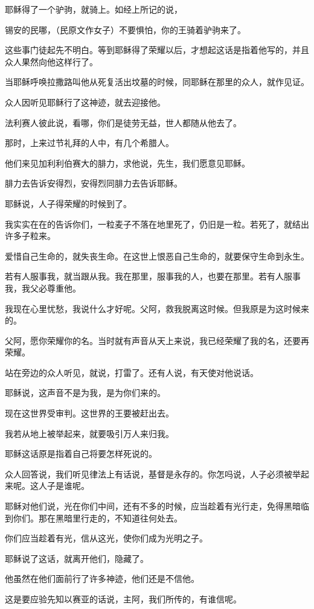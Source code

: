 \documentclass[12pt,oneside]{book}
\begin{document}
耶稣得了一个驴驹，就骑上。如经上所记的说，

锡安的民哪，（民原文作女子）不要惧怕，你的王骑着驴驹来了。

这些事门徒起先不明白。等到耶稣得了荣耀以后，才想起这话是指着他写的，并且众人果然向他这样行了。

当耶稣呼唤拉撒路叫他从死复活出坟墓的时候，同耶稣在那里的众人，就作见证。

众人因听见耶稣行了这神迹，就去迎接他。

法利赛人彼此说，看哪，你们是徒劳无益，世人都随从他去了。

那时，上来过节礼拜的人中，有几个希腊人。

他们来见加利利伯赛大的腓力，求他说，先生，我们愿意见耶稣。

腓力去告诉安得烈，安得烈同腓力去告诉耶稣。

耶稣说，人子得荣耀的时候到了。

我实实在在的告诉你们，一粒麦子不落在地里死了，仍旧是一粒。若死了，就结出许多子粒来。

爱惜自己生命的，就失丧生命。在这世上恨恶自己生命的，就要保守生命到永生。

若有人服事我，就当跟从我。我在那里，服事我的人，也要在那里。若有人服事我，我父必尊重他。

我现在心里忧愁，我说什么才好呢。父阿，救我脱离这时候。但我原是为这时候来的。

父阿，愿你荣耀你的名。当时就有声音从天上来说，我已经荣耀了我的名，还要再荣耀。

站在旁边的众人听见，就说，打雷了。还有人说，有天使对他说话。

耶稣说，这声音不是为我，是为你们来的。

现在这世界受审判。这世界的王要被赶出去。

我若从地上被举起来，就要吸引万人来归我。

耶稣这话原是指着自己将要怎样死说的。

众人回答说，我们听见律法上有话说，基督是永存的。你怎吗说，人子必须被举起来呢。这人子是谁呢。

耶稣对他们说，光在你们中间，还有不多的时候，应当趁着有光行走，免得黑暗临到你们。那在黑暗里行走的，不知道往何处去。

你们应当趁着有光，信从这光，使你们成为光明之子。

耶稣说了这话，就离开他们，隐藏了。

他虽然在他们面前行了许多神迹，他们还是不信他。

这是要应验先知以赛亚的话说，主阿，我们所传的，有谁信呢。
\end{document}
